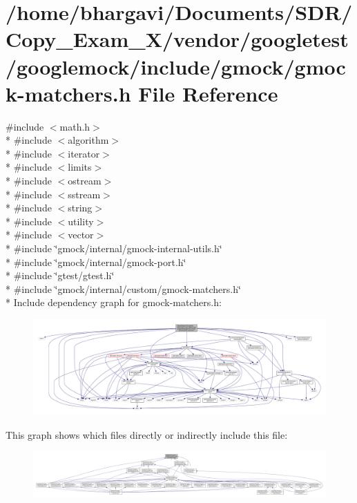 \hypertarget{gmock-matchers_8h}{}\section{/home/bhargavi/\+Documents/\+S\+D\+R/\+Copy\+\_\+\+Exam\+\_\+X/vendor/googletest/googlemock/include/gmock/gmock-\/matchers.h File Reference}
\label{gmock-matchers_8h}
{\ttfamily \#include $<$math.\+h$>$}\\*
{\ttfamily \#include $<$algorithm$>$}\\*
{\ttfamily \#include $<$iterator$>$}\\*
{\ttfamily \#include $<$limits$>$}\\*
{\ttfamily \#include $<$ostream$>$}\\*
{\ttfamily \#include $<$sstream$>$}\\*
{\ttfamily \#include $<$string$>$}\\*
{\ttfamily \#include $<$utility$>$}\\*
{\ttfamily \#include $<$vector$>$}\\*
{\ttfamily \#include \char`\"{}gmock/internal/gmock-\/internal-\/utils.\+h\char`\"{}}\\*
{\ttfamily \#include \char`\"{}gmock/internal/gmock-\/port.\+h\char`\"{}}\\*
{\ttfamily \#include \char`\"{}gtest/gtest.\+h\char`\"{}}\\*
{\ttfamily \#include \char`\"{}gmock/internal/custom/gmock-\/matchers.\+h\char`\"{}}\\*
Include dependency graph for gmock-\/matchers.h\+:
\nopagebreak
\begin{figure}[H]
\begin{center}
\leavevmode
\includegraphics[width=350pt]{gmock-matchers_8h__incl}
\end{center}
\end{figure}
This graph shows which files directly or indirectly include this file\+:
\nopagebreak
\begin{figure}[H]
\begin{center}
\leavevmode
\includegraphics[width=350pt]{gmock-matchers_8h__dep__incl}
\end{center}
\end{figure}
